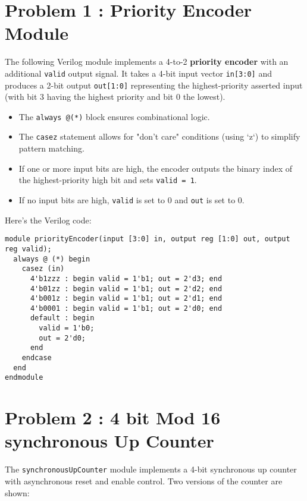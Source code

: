 \documentclass{article}
\begin{document}
\section*{Problem 1 : Priority Encoder Module}

The following Verilog module implements a 4-to-2 \textbf{priority encoder} with an additional \texttt{valid} output signal. It takes a 4-bit input vector \texttt{in[3:0]} and produces a 2-bit output \texttt{out[1:0]} representing the highest-priority asserted input (with bit 3 having the highest priority and bit 0 the lowest).

\begin{itemize}
	\item The \texttt{always @(*)} block ensures combinational logic.
	\item The \texttt{casez} statement allows for "don't care" conditions (using `z`) to simplify pattern matching.
	\item If one or more input bits are high, the encoder outputs the binary index of the highest-priority high bit and sets \texttt{valid = 1}.
	\item If no input bits are high, \texttt{valid} is set to 0 and \texttt{out} is set to 0.
\end{itemize}

\noindent Here's the Verilog code:

\begin{lstlisting}
module priorityEncoder(input [3:0] in, output reg [1:0] out, output reg valid);
  always @ (*) begin
    casez (in)
      4'b1zzz : begin valid = 1'b1; out = 2'd3; end
      4'b01zz : begin valid = 1'b1; out = 2'd2; end
      4'b001z : begin valid = 1'b1; out = 2'd1; end
      4'b0001 : begin valid = 1'b1; out = 2'd0; end
      default : begin
        valid = 1'b0;
        out = 2'd0;
      end
    endcase
  end
endmodule
\end{lstlisting}

\section*{Problem 2 : 4 bit Mod 16 synchronous Up Counter}

The \texttt{synchronousUpCounter} module implements a 4-bit synchronous up counter with asynchronous reset and enable control. Two versions of the counter are shown:
\end{document}
